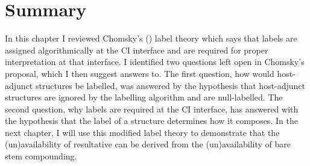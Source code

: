 \documentclass[MilwayThesis]{subfiles}
\begin{document}
\section{Summary}
In this chapter I reviewed Chomsky's (\citeyear{chomsky2013problems,chomsky2015problems}) label theory which says that labels are assigned algorithmically at the CI interface and are required for proper interpretation at that interface.
I identified two questions left open in Chomsky's proposal, which I then suggest answers to.
The first question, how would host-adjunct structures be labelled, was answered by the hypothesis that host-adjunct structures are ignored by the labelling algorithm and are null-labelled.
The second question, why labels are required at the CI interface, has answered with the hypothesis that the label of a structure determines how it composes.
In the next chapter, I will use this modified label theory to demonstrate that the (un)availability of resultative can be derived from the (un)availability of bare stem compounding.
\end{document}
